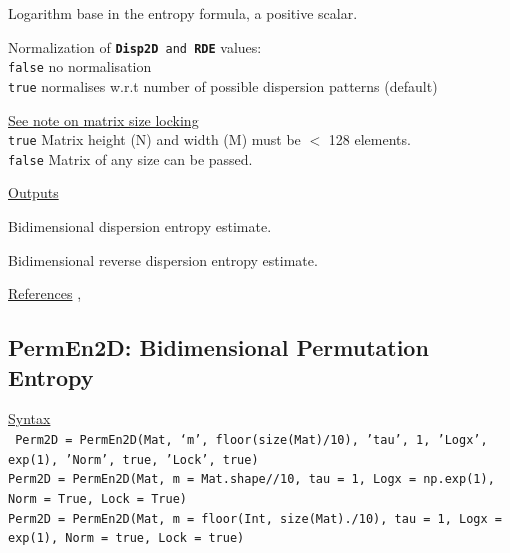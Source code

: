 \documentclass[12pt, a4paper, titlepage, openany]{book}
\begin{document}
\begin{description}[labelsep=1cm, labelwidth=2cm, nosep,,style=multiline,leftmargin=3cm]
\begin{description}[labelsep=5em, labelwidth=8em, nosep,style=multiline,leftmargin=3cm]
	\end{description}
\item[\texttt{Logx}]	Logarithm base in the entropy formula, a positive scalar.
\item[\texttt{Norm}]	Normalization of \texttt{\textbf{Disp2D} and \textbf{RDE}} values:\\
		  \texttt{false} \hspace{10pt} no normalisation \\
		  \texttt{true} \hspace{15pt} normalises w.r.t number of possible dispersion patterns (default)
\item[\texttt{Lock}]	\hyperlink{bidinote}{\ul{See note on matrix size locking}}\\
		  \texttt{true} \hspace{15pt} Matrix height (N) and width (M) must be $<$ 128 elements.\\
		  \texttt{false}\hspace{12pt} Matrix of any size can be passed.\\ 
\end{description}

\noindent \ul{Outputs}
\begin{description}[labelsep=1cm, labelwidth=2cm, nosep, style=multiline,leftmargin=3cm]\footnotesize
\item[\texttt{Dist2D}]		Bidimensional dispersion entropy estimate.
\item[\texttt{RDE}]		Bidimensional reverse dispersion entropy estimate.
\end{description}

\noindent \ul{References}\hspace{1cm}
\cite{Disp2D1},



\newpage
\subsection{\normalsize PermEn2D: \hspace{15mm} Bidimensional Permutation Entropy}
\noindent\ul{Syntax} \vspace{6mm} \\ \noindent \texttt{\footnotesize
Perm2D = PermEn2D(Mat, ‘m’, floor(size(Mat)/10), 'tau', 1, 'Logx', exp(1), 'Norm', true, 'Lock', true)\\
Perm2D = PermEn2D(Mat, m = Mat.shape//10, tau = 1, Logx = np.exp(1), Norm = True, Lock = True)\\
Perm2D = PermEn2D(Mat, m = floor(Int, size(Mat)./10), tau = 1, Logx = exp(1), Norm = true, Lock = true)}
\vspace{1cm}
\end{document}
